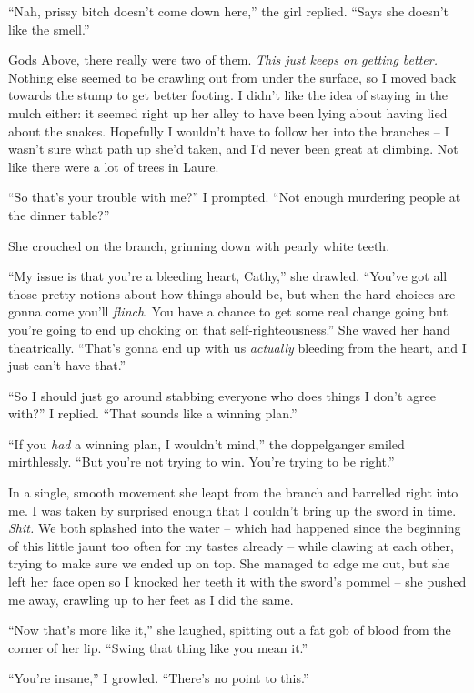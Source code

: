 \documentclass[12pt, openany]{book}
\begin{document}
“Nah, prissy bitch doesn’t come down here,” the girl replied. “Says she doesn’t like the smell.”

Gods Above, there really were two of them. \textit{This just keeps on getting better. }Nothing else seemed to be crawling out from under the surface, so I moved back towards the stump to get better footing. I didn’t like the idea of staying in the mulch either: it seemed right up her alley to have been lying about having lied about the snakes. Hopefully I wouldn’t have to follow her into the branches – I wasn’t sure what path up she’d taken, and I’d never been great at climbing. Not like there were a lot of trees in Laure.

“So that’s your trouble with me?” I prompted. “Not enough murdering people at the dinner table?”

She crouched on the branch, grinning down with pearly white teeth.

“My issue is that you’re a bleeding heart, Cathy,” she drawled. “You’ve got all those pretty notions about how things should be, but when the hard choices are gonna come you’ll \textit{flinch}. You have a chance to get some real change going but you’re going to end up choking on that self-righteousness.” She waved her hand theatrically. “That’s gonna end up with us \textit{actually} bleeding from the heart, and I just can’t have that.”

“So I should just go around stabbing everyone who does things I don’t agree with?” I replied. “That sounds like a winning plan.”

“If you \textit{had} a winning plan, I wouldn’t mind,” the doppelganger smiled mirthlessly. “But you’re not trying to win. You’re trying to be right.”

In a single, smooth movement she leapt from the branch and barrelled right into me. I was taken by surprised enough that I couldn’t bring up the sword in time. \textit{Shit.} We both splashed into the water – which had happened since the beginning of this little jaunt too often for my tastes already – while clawing at each other, trying to make sure we ended up on top. She managed to edge me out, but she left her face open so I knocked her teeth it with the sword’s pommel – she pushed me away, crawling up to her feet as I did the same.

“Now that’s more like it,” she laughed, spitting out a fat gob of blood from the corner of her lip. “Swing that thing like you mean it.”

“You’re insane,” I growled. “There’s no point to this.”
\end{document}
